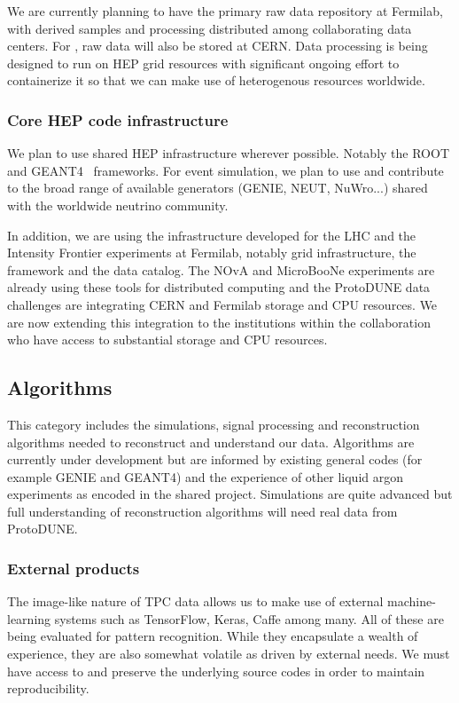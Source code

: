 We are currently planning to have the primary raw data repository at Fermilab, with derived samples and processing distributed among collaborating data centers.  For , raw data will also be stored at CERN.  Data processing is being designed to run on HEP grid resources with significant ongoing effort to containerize it so that we can make use of heterogenous resources worldwide. 


\subsubsection{Core HEP code infrastructure}
We plan to use shared HEP infrastructure wherever possible.  Notably the ROOT\cite{root} and GEANT4~\cite{geant4,Allison:2006ve} frameworks.   For event simulation, we plan to use and contribute to  the broad range of available generators (GENIE, NEUT, NuWro...) shared with the worldwide neutrino community.

In addition, we are using the infrastructure developed for the LHC and the Intensity Frontier experiments at Fermilab, notably grid infrastructure,  the  framework and the  data catalog.  The NOvA and MicroBooNe experiments are already using these tools for distributed computing and the ProtoDUNE data challenges are integrating CERN and Fermilab storage and CPU resources.  We are now extending this integration to the  institutions within the collaboration who have access to substantial storage and CPU resources. 



\subsection{Algorithms}
This category includes the simulations, signal processing and reconstruction algorithms needed to reconstruct and understand our data. Algorithms are currently under development but are  informed by existing general codes (for example GENIE and GEANT4) and the experience of other liquid argon experiments as encoded in the shared   project.  Simulations are quite advanced but full understanding of reconstruction algorithms will need real data from ProtoDUNE. 

\subsubsection{External products}
The image-like nature of TPC data allows us to make use of external machine-learning systems such as TensorFlow\cite{DBLP:journals/corr/AbadiABBCCCDDDG16}, 
Keras\cite{chollet2015keras}, Caffe\cite{Jia:2014:CCA:2647868.2654889} among many.  All of these are being evaluated for pattern recognition. While they encapsulate a wealth of experience, they are also somewhat volatile as driven by external needs.  We must have access to and preserve the underlying source codes in order to maintain reproducibility. 



